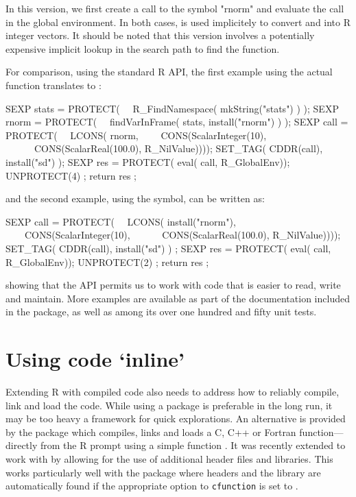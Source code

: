 In this version, we first create a call to the symbol "rnorm" and
evaluate the call in the global environment. In both cases, 
is used implicitely to convert  and  
into R integer vectors. It should be noted that this 
version involves a potentially expensive implicit lookup in the search path
to find the  function. 

For comparison, using the standard R API, the first example using the actual  function
translates to :

\begin{example}
SEXP stats = PROTECT( 
\ \ R_FindNamespace( mkString("stats") ) );
SEXP rnorm = PROTECT( 
\ \ findVarInFrame( stats, install("rnorm") ) );
SEXP call  = PROTECT( 
\ \ LCONS( rnorm, 
\ \ \ \ CONS(ScalarInteger(10), 
\ \ \ \ \ \ CONS(ScalarReal(100.0), R_NilValue))));
SET_TAG( CDDR(call), install("sd") );
SEXP res = PROTECT( eval( call, R_GlobalEnv));
UNPROTECT(4) ;
return res ;
\end{example}

and the second example, using the  symbol, can be written as:

\begin{example}
SEXP call  = PROTECT( 
\ \ LCONS( install("rnorm"), 
\ \ \ \ CONS(ScalarInteger(10), 
\ \ \ \ \ \ CONS(ScalarReal(100.0), R_NilValue))));
SET_TAG( CDDR(call), install("sd") ) ;
SEXP res = PROTECT( eval( call, R_GlobalEnv));
UNPROTECT(2) ;
return res ;
\end{example}

showing that the  API permits us to work with code that is easier
to read, write and maintain. More examples are available as part of the documentation
included in the  package, as well as among its over one hundred and
fifty unit tests.

\section{Using code `inline'}
\label{sec:inline}

Extending R with compiled code also needs to address how to reliably compile,
link and load the code.  While using a package is preferable in the long run,
it may be too heavy a framework for quick explorations.  An alternative is
provided by the  package \citep{cran:inline} which compiles,
links and loads a C, C++ or Fortran function---directly from the R prompt
using a simple function .  It was recently extended to work
with  by allowing for the use of additional header files and
libraries. This works particularly well with the  package where
headers and the library are automatically found if the appropriate option
 to \texttt{cfunction} is set to .

